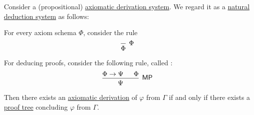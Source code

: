 \begin{proposition}\label{thm:axiomatic_derivation_as_natural_deduction}
  Consider a (propositional) \hyperref[def:axiomatic_derivation_system]{axiomatic derivation system}. We regard it as a \hyperref[def:natural_deduction_system]{natural deduction system} as follows:
  \begin{thmenum}
     For every axiom schema \( \Phi \), consider the rule
    \begin{equation*}
      \begin{prooftree}
        \infer0[\( \Phi \)]{ \Phi }
      \end{prooftree}
    \end{equation*}

     For deducing proofs, consider the following rule, called :
    \begin{equation*}
      \begin{prooftree}
        \hypo{ \Phi \rightarrow \Psi }
        \hypo{ \Phi }
        \infer2[\logic{MP}]{ \Psi }
      \end{prooftree}
    \end{equation*}
  \end{thmenum}

  Then there exists an \hyperref[def:axiomatic_derivation]{axiomatic derivation} of \( \varphi \) from \( \Gamma \) if and only if there exists a \hyperref[def:natural_deduction_proof_tree]{proof tree} concluding \( \varphi \) from \( \Gamma \).
\end{proposition}

